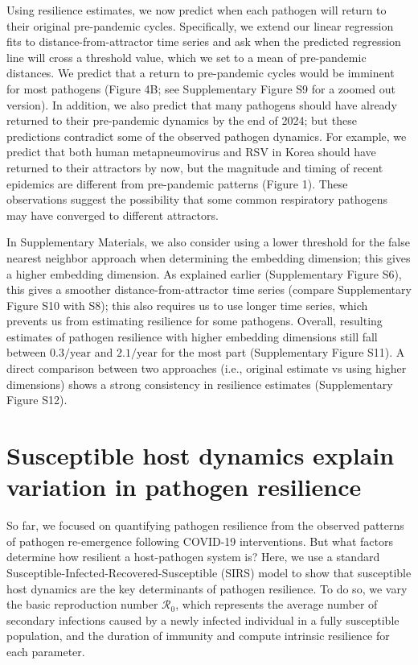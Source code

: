 \documentclass[12pt]{article}
\begin{document}
Using resilience estimates, we now predict when each pathogen will return to their original pre-pandemic cycles.
Specifically, we extend our linear regression fits to distance-from-attractor time series and ask when the predicted regression line will cross a threshold value, which we set to a mean of pre-pandemic distances.
We predict that a return to pre-pandemic cycles would be imminent for most pathogens (Figure 4B; see Supplementary Figure S9 for a zoomed out version).
In addition, we also predict that many pathogens should have already returned to their pre-pandemic dynamics by the end of 2024; 
but these predictions contradict some of the observed pathogen dynamics.
For example, we predict that both human metapneumovirus and RSV in Korea should have returned to their attractors by now, but the magnitude and timing of recent epidemics are different from pre-pandemic patterns (Figure 1). 
These observations suggest the possibility that some common respiratory pathogens may have converged to different attractors.

In Supplementary Materials, we also consider using a lower threshold for the false nearest neighbor approach when determining the embedding dimension;
this gives a higher embedding dimension.
As explained earlier (Supplementary Figure S6), this gives a smoother distance-from-attractor time series (compare Supplementary Figure S10 with S8);
this also requires us to use longer time series, which prevents us from estimating resilience for some pathogens.
Overall, resulting estimates of pathogen resilience with higher embedding dimensions still fall between $0.3/\mathrm{year}$ and $2.1/\mathrm{year}$ for the most part (Supplementary Figure S11).
A direct comparison between two approaches (i.e., original estimate vs using higher dimensions) shows a strong consistency in resilience estimates (Supplementary Figure S12).

\section*{Susceptible host dynamics explain variation in pathogen resilience}

So far, we focused on quantifying pathogen resilience from the observed patterns of pathogen re-emergence following COVID-19 interventions.
But what factors determine how resilient a host-pathogen system is?
Here, we use a standard Susceptible-Infected-Recovered-Susceptible (SIRS) model to show that susceptible host dynamics are the key determinants of pathogen resilience.
To do so, we vary the basic reproduction number $\mathcal R_0$, which represents the average number of secondary infections caused by a newly infected individual in a fully susceptible population, and the duration of immunity and compute intrinsic resilience for each parameter.
\end{document}
